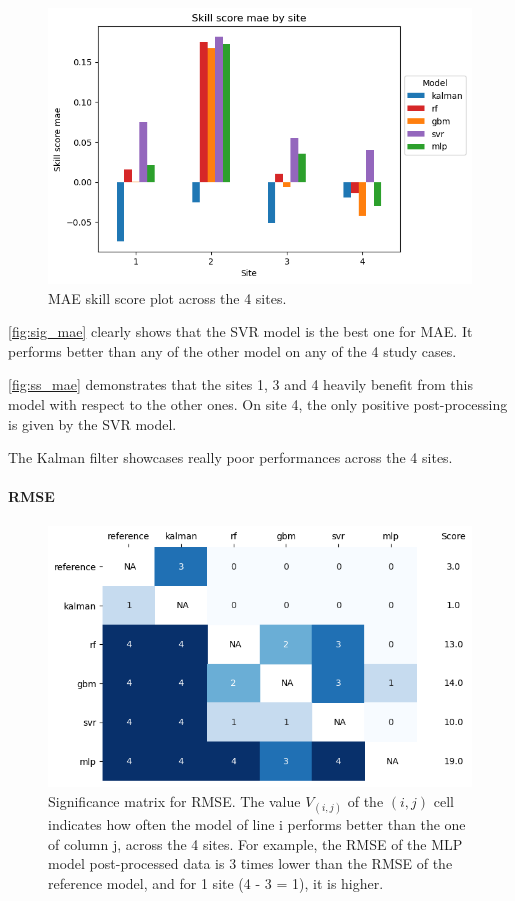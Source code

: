 \begin{figure}[htb!]
    \centering
    \includegraphics[width=\columnwidth]{figures/first_study/ss_mae.png}
    \caption{MAE skill score plot across the 4 sites.}
\label{fig:ss_mae}
\end{figure}
\autoref{fig:sig_mae} clearly shows that the SVR model is the best one for MAE. It performs better than any of the other model on any of the 4 study cases.

\autoref{fig:ss_mae} demonstrates that the sites 1, 3 and 4 heavily benefit from this model with respect to the other ones. 
On site 4, the only positive post-processing is given by the SVR model.

The Kalman filter showcases really poor performances across the 4 sites.

\newpage
\paragraph{RMSE}\indent

\begin{figure}[htb!]
    \centering
    \includegraphics[width=\columnwidth]{figures/first_study/significance_matrix_rmse.png}
\caption{Significance matrix for RMSE. The value $V_{(i,j)}$ of the $(i,j)$ cell indicates how often the model of line i performs better than the one of column j, across the 
4 sites. For example, the RMSE of the MLP model post-processed data is 3 times lower than the RMSE of the reference model, and for 1 site (4 - 3 = 1), it is higher.}
\label{fig:sig_rmse}
\end{figure}

